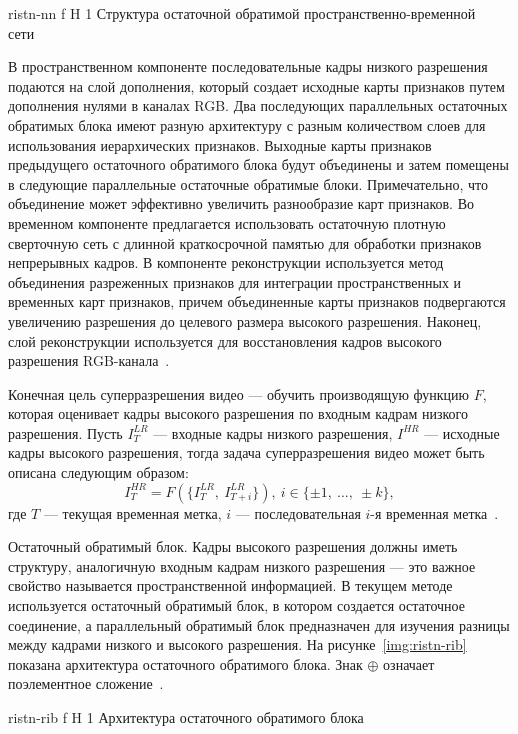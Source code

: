 \documentclass{bmstu}
\begin{document}
    {ristn-nn}
    {f}
    {H}
    {1\textwidth}
    {Структура остаточной обратимой пространственно-временной сети~\cite{Xiaobin2019}}
    
В пространственном компоненте последовательные кадры низкого разрешения подаются на слой дополнения, который создает исходные карты признаков путем дополнения нулями в каналах RGB. 
Два последующих параллельных остаточных обратимых блока имеют разную архитектуру с разным количеством слоев для использования иерархических признаков. 
Выходные карты признаков предыдущего остаточного обратимого блока будут объединены и затем помещены в следующие параллельные остаточные обратимые блоки. 
Примечательно, что объединение может эффективно увеличить разнообразие карт признаков. 
Во временном компоненте предлагается использовать остаточную плотную сверточную сеть с длинной краткосрочной памятью для обработки признаков непрерывных кадров. 
В компоненте реконструкции используется метод объединения разреженных признаков для интеграции пространственных и временных карт признаков, причем объединенные карты признаков подвергаются увеличению разрешения до целевого размера высокого разрешения. 
Наконец, слой реконструкции используется для восстановления кадров высокого разрешения RGB-канала~\cite{Xiaobin2019}.

Конечная цель суперразрешения видео --- обучить производящую функцию $F$, которая оценивает кадры высокого разрешения по входным кадрам низкого разрешения. 
Пусть $I^{LR}_T$ --- входные кадры низкого разрешения, $I^{HR}$ --- исходные кадры высокого разрешения, тогда задача суперразрешения видео может быть описана следующим образом:
\begin{equation}
I^{HR}_T = F(\{I^{LR}_T,~I^{LR}_{T + i}\}),~i \in \{\pm 1,~...,~\pm k\},
\end{equation}
где $T$ --- текущая временная метка, $i$ --- последовательная $i$-я временная метка~\cite{Xiaobin2019}.

Остаточный обратимый блок. 
Кадры высокого разрешения должны иметь структуру, аналогичную входным кадрам низкого разрешения --- это важное свойство называется пространственной информацией. 
В текущем методе используется остаточный обратимый блок, в котором создается остаточное соединение, а параллельный обратимый блок предназначен для изучения разницы между кадрами низкого и высокого разрешения. 
На рисунке~\ref{img:ristn-rib} показана архитектура остаточного обратимого блока. 
Знак $\oplus$ означает поэлементное сложение~\cite{Xiaobin2019}.

    {ristn-rib}
    {f}
    {H}
    {1\textwidth}
    {Архитектура остаточного обратимого блока~\cite{Xiaobin2019}}
    
\end{document}
